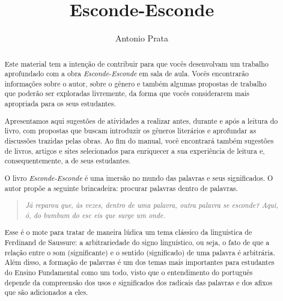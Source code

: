 \documentclass[11pt]{extarticle}
\newcommand{\AutorLivro}{Antonio Prata}
\newcommand{\TituloLivro}{Esconde-Esconde}
\newcommand{\colaborador}{Gabriela Karam}
\begin{document}
\title{\TituloLivro}
\author{\AutorLivro}
\def\authornotes{\colaborador}

\date{}
\maketitle


\tableofcontents



\begin{abstract}

Este material tem a intenção de contribuir para que vocês desenvolvam um trabalho aprofundado com a obra \textit{Esconde-Esconde} em sala de aula.
Vocês encontrarão informações sobre o autor, sobre o gênero e também 
algumas propostas de trabalho que poderão ser exploradas livremente, 
da forma que vocês considerarem mais apropriada para os seus estudantes.

Apresentamos aqui sugestões de atividades a realizar antes, durante e após a leitura do livro, com propostas que buscam introduzir os gêneros literários e aprofundar as discussões trazidas pelas obras. Ao fim do manual, você encontrará também sugestões de livros, artigos e sites selecionados para enriquecer a sua experiência de leitura e, consequentemente, a de seus estudantes.


O livro \textit{Esconde-Esconde} é uma imersão no mundo das palavras e seus significados. O autor propõe a seguinte brincadeira: procurar palavras dentro de palavras.

\begin{quote}

\textit{Já reparou que, às vezes, dentro de uma palavra, outra palavra se esconde? Aqui, ó, do bumbum do esc eis que surge um onde.}

\end{quote}

Esse é o mote para tratar de maneira lúdica um tema clássico da linguística de Ferdinand de Saussure: a arbitrariedade do signo linguístico, ou seja, o fato de que a relação entre o som (significante) e o sentido (significado) de uma palavra é arbitrária. Além disso, a formação de palavras é um dos temas mais importantes para estudantes do Ensino Fundamental como um todo, visto que o entendimento do português depende da compreensão dos usos e significados dos radicais das palavras e dos afixos que são adicionados a eles. 


\end{abstract}
\end{document}
